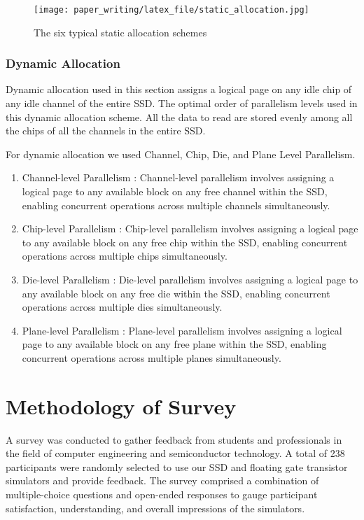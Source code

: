 \documentclass[conference]{/home/habib/Desktop/flash_ssd_simulator_web/paper_writing/latex_file/IEEEtran}
\begin{document}
\begin{figure}[h]
    \centering
    \texttt{[image: paper\_writing/latex\_file/static\_allocation.jpg]}
    \caption{The six typical static allocation schemes}
    \label{fig:static_allocation}
\end{figure}
\subsubsection{Dynamic Allocation}
Dynamic allocation used in this section assigns a logical page on any idle chip of any idle channel of the entire SSD. The optimal order of parallelism levels used in this dynamic allocation scheme. All the data to read are stored evenly among all the chips of all the channels in the entire SSD. 

For dynamic allocation we used Channel, Chip, Die, and Plane Level Parallelism. 
\begin{enumerate}
    \item Channel-level Parallelism : Channel-level parallelism involves assigning a logical page to any available block on any free channel within the SSD, enabling concurrent operations across multiple channels simultaneously.
    \item Chip-level Parallelism : Chip-level parallelism involves assigning a logical page to any available block on any free chip within the SSD, enabling concurrent operations across multiple chips simultaneously.
    \item Die-level Parallelism : Die-level parallelism involves assigning a logical page to any available block on any free die within the SSD, enabling concurrent operations across multiple dies simultaneously.
    \item Plane-level Parallelism : Plane-level parallelism involves assigning a logical page to any available block on any free plane within the SSD, enabling concurrent operations across multiple planes simultaneously.
\end{enumerate}

\section{Methodology of Survey}
A survey was conducted to gather feedback from students and professionals in the field of computer engineering and semiconductor technology. A total of 238 participants were randomly selected to use our SSD and floating gate transistor simulators and provide feedback. The survey comprised a combination of multiple-choice questions and open-ended responses to gauge participant satisfaction, understanding, and overall impressions of the simulators.
\end{document}
